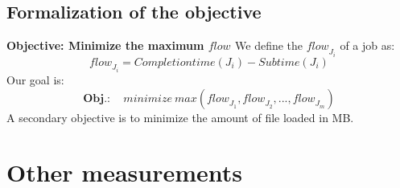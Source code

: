 \documentclass[a4paper]{article}
\newtheorem{definition}{Definition}
\newcommand{\Node}[1]{\ensuremath{\mathrm{Node}_{#1}}\xspace}
\newcommand{\flow}[1]{\ensuremath{\mathit{flow}_{#1}}\xspace}
\newcommand{\inputs}{\ensuremath{\mathcal{F}}\xspace}
\newcommand{\memory}{\ensuremath{\mathcal{M}}\xspace}
\newcommand{\submissiontime}{\mathit{Subtime}\xspace}
\newcommand{\completiontime}{\mathit{Completiontime}\xspace}
\newcommand{\evict}{\ensuremath{\mathcal{V}}\xspace}
\newcommand{\nbloads}{\ensuremath{\mathit{\mathit{Loads}}}\xspace}
\newcommand{\live}{\ensuremath{L}\xspace}
\begin{document}


\subsection{Formalization of the objective}
\textbf{Objective: Minimize the maximum \flow{}}
		We define the \flow{J_i} of a job as:
		$$
			\flow{J_i} = \completiontime(J_i) - \submissiontime(J_i)
		$$
		Our goal is:
		$$
			\textbf{Obj.}: \quad \mathit{minimize}~\mathit{max}(\flow{J_1}, \flow{J_2}, ..., \flow{J_m})
		$$
A secondary objective is to minimize the amount of file loaded in MB.

\section{Other measurements}

\end{document}
